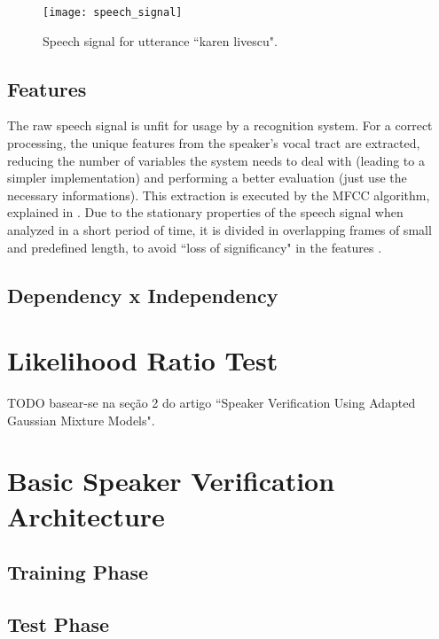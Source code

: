 \begin{figure}[ht]
    \centering
    \texttt{[image: speech\_signal]}
    \caption{Speech signal for utterance ``karen livescu".}
    \label{fig:speech_signal}
\end{figure}

\subsection{Features}

The raw speech signal is unfit for usage by a recognition system. For a correct processing, the unique features from the speaker's vocal tract are extracted, reducing the number of variables the system needs to deal with (leading to a simpler implementation) and performing a better evaluation (just use the necessary informations). This extraction is executed by the MFCC algorithm, explained in . Due to the stationary properties of the speech signal when analyzed in a short period of time, it is divided in overlapping frames of small and predefined length, to avoid ``loss of significancy" in the features \cite{davis.mermelstein.1980, rabiner.schafer.2007}.

\subsection{Dependency x Independency}

\section{Likelihood Ratio Test}

TODO basear-se na seção 2 do artigo ``Speaker Verification Using Adapted Gaussian Mixture Models".

\section{Basic Speaker Verification Architecture}

\subsection{Training Phase}

\subsection{Test Phase}